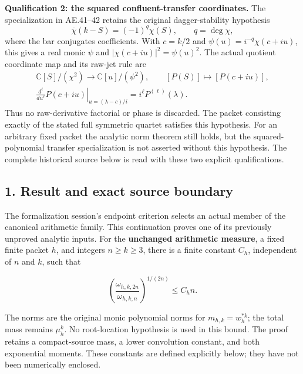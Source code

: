 \textbf{Qualification 2: the squared confluent-transfer coordinates.}
The specialization in AE.41--42 retains the original dagger-stability
hypothesis
\[
\overline{\chi}(k-S)=(-1)^q\chi(S),\qquad q=\deg\chi,
\]
where the bar conjugates coefficients. With \(c=k/2\) and
\(\psi(u)=i^{-q}\chi(c+iu)\), this gives a real monic \(\psi\) and
\(\lvert\chi(c+iu)\rvert^2=\psi(u)^2\). The actual quotient
coordinate map and its raw-jet rule are
\[
\begin{gathered}
\mathbb C[S]/(\chi^2)\longrightarrow\mathbb C[u]/(\psi^2),
\qquad [P(S)]\longmapsto[P(c+iu)],
\\
\left.\frac{d^\ell}{du^\ell}P(c+iu)\right|_{u=(\lambda-c)/i}
=i^\ell P^{(\ell)}(\lambda).
\end{gathered}
\]
Thus no raw-derivative factorial or phase is discarded. The packet
consisting exactly of the stated full symmetric quartet satisfies this
hypothesis. For an arbitrary fixed packet the analytic norm theorem
still holds, but the squared-polynomial transfer specialization is not
asserted without this hypothesis. The complete historical source below
is read with these two explicit qualifications.

\begingroup
\setlength{\emergencystretch}{3em}
\providecommand{\tightlist}{\setlength{\itemsep}{0pt}\setlength{\parskip}{0pt}}

\subsection*{1. Result and exact source
boundary}
\label{AE.result-and-exact-source-boundary}

The formalization session's endpoint criterion selects an actual member
of the canonical arithmetic family. This continuation proves one of its
previously unproved analytic inputs. For the \textbf{unchanged
arithmetic measure}, a fixed finite packet \(h\), and integers
\(n\ge k\ge3\), there is a finite constant \(C_h\), independent of \(n\)
and \(k\), such that

\[
 \boxed{\left(\frac{\omega_{h,k,2n}}{\omega_{h,k,n}}\right)^{1/(2n)}
       \le C_h n.}                                                    \tag{AE.1}\label{AE.eq.1}
\]

The norms are the original monic polynomial norms for
\(m_{h,k}=w_h^{*k}\); the total mass remains \(\mu_h^k\). No
root-location hypothesis is used in this bound. The proof retains a
compact-source mass, a lower convolution constant, and both exponential
moments. These constants are defined explicitly below; they have not
been numerically enclosed.

